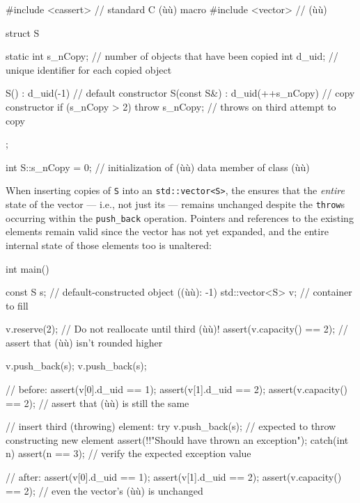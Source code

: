 \begin{emcppslisting}
#include <cassert>  // standard C (ù{}ù) macro
#include <vector>   // (ù{}ù)

struct S
{
    static int s_nCopy;  // number of objects that have been copied
    int        d_uid;    // unique identifier for each copied object

    S()         : d_uid(-1) { }     // default constructor
    S(const S&) : d_uid(++s_nCopy)  // copy constructor
    {
        if (s_nCopy > 2) throw s_nCopy;  // throws on third attempt to copy
    }
};

int S::s_nCopy = 0; // initialization of (ù{}ù) data member of class (ù{}ù)
\end{emcppslisting}
    

\noindent When inserting copies of \lstinline!S! into an \lstinline!std::vector<S>!, the
 ensures that the \emph{entire} state of the
vector --- i.e., not just its  --- remains
unchanged despite the \lstinline!throw!s occurring within the
\lstinline!push_back! operation. Pointers and references to the existing
elements remain valid since the vector has not yet expanded, and the
entire internal state of those elements too is unaltered:

\begin{emcppslisting}
int main()
{
    const S s;                  // default-constructed object ((ù{}ù): -1)
    std::vector<S> v;           // container to fill

    v.reserve(2);               // Do not reallocate until third (ù{}ù)!
    assert(v.capacity() == 2);  // assert that (ù{}ù) isn't rounded higher

    v.push_back(s);
    v.push_back(s);

    // before:
    assert(v[0].d_uid == 1);
    assert(v[1].d_uid == 2);
    assert(v.capacity() == 2);  // assert that (ù{}ù) is still the same

    // insert third (throwing) element:
    try
    {
        v.push_back(s);          // expected to throw constructing new element
        assert(!!"Should have thrown an exception");
    }
    catch(int n)
    {
        assert(n == 3);         // verify the expected exception value
    }

    // after:
    assert(v[0].d_uid == 1);
    assert(v[1].d_uid == 2);
    assert(v.capacity() == 2);  // even the vector's (ù{}ù) is unchanged
}
\end{emcppslisting}
    

